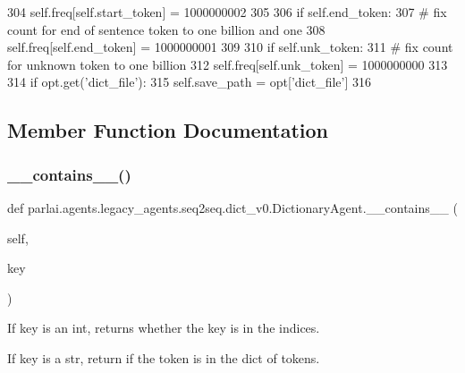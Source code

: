 \begin{DoxyCode}
304                 self.freq[self.start\_token] = 1000000002
305 
306             \textcolor{keywordflow}{if} self.end\_token:
307                 \textcolor{comment}{# fix count for end of sentence token to one billion and one}
308                 self.freq[self.end\_token] = 1000000001
309 
310             \textcolor{keywordflow}{if} self.unk\_token:
311                 \textcolor{comment}{# fix count for unknown token to one billion}
312                 self.freq[self.unk\_token] = 1000000000
313 
314             \textcolor{keywordflow}{if} opt.get(\textcolor{stringliteral}{'dict\_file'}):
315                 self.save\_path = opt[\textcolor{stringliteral}{'dict\_file'}]
316 
\end{DoxyCode}


\subsection{Member Function Documentation}
\mbox{\label{classparlai_1_1agents_1_1legacy__agents_1_1seq2seq_1_1dict__v0_1_1DictionaryAgent_ac5b925ffaabf30466d54176a80ae783c}} 
\subsubsection{\texorpdfstring{\+\_\+\+\_\+contains\+\_\+\+\_\+()}{\_\_contains\_\_()}}
{\footnotesize\ttfamily def parlai.\+agents.\+legacy\+\_\+agents.\+seq2seq.\+dict\+\_\+v0.\+Dictionary\+Agent.\+\_\+\+\_\+contains\+\_\+\+\_\+ (\begin{DoxyParamCaption}\item[{}]{self,  }\item[{}]{key }\end{DoxyParamCaption})}

\begin{DoxyVerb}If key is an int, returns whether the key is in the indices.

If key is a str, return if the token is in the dict of tokens.
\end{DoxyVerb}
 

